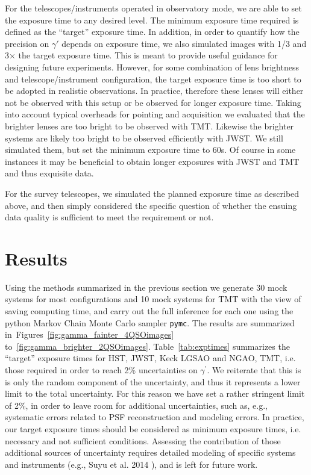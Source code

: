 \documentclass[a4paper,11pt]{article}
\begin{document}
{For the telescopes/instruments operated in observatory mode, we are
able to set the exposure time to any desired level. The minimum
exposure time required is defined as the ``target'' exposure time. In
addition, in order to quantify how the precision on $\gamma'$ depends
on exposure time, we also simulated images with 1/3 and 3$\times$ the
target exposure time. This is meant to provide useful guidance for
designing future experiments. However, for some combination of lens
brightness and telescope/instrument configuration, the target exposure
time is too short to be adopted in realistic observations. In
practice, therefore these lenses will either not be observed with this
setup or be observed for longer exposure time. Taking into account
typical overheads for pointing and acquisition we evaluated that the
brighter lenses are too bright to be observed with TMT.  Likewise the
brighter systems are likely too bright to be observed efficiently with
JWST. We still simulated them, but set the minimum exposure time to
60s. Of course in some instances it may be beneficial to obtain longer
exposures with JWST and TMT and thus exquisite data.

For the survey telescopes, we simulated the planned exposure time as
described above, and then  simply considered the specific question of
whether the ensuing data quality is sufficient to meet the requirement
or not.

\section{Results}

Using the methods summarized in the previous section we generate 30
mock systems for most configurations and 10 mock systems for TMT with
the view of saving computing time, and carry out the full inference
for each one using the python Markov Chain Monte Carlo sampler
\texttt{pymc}.  The results are summarized
in~Figures~\ref{fig:gamma_fainter_4QSOimages}
to~\ref{fig:gamma_brighter_2QSOimages}. Table~\ref{tab:exptimes}
summarizes the ``target'' exposure times for HST, JWST, Keck LGSAO and
NGAO, TMT, i.e. those required in order to reach 2\% uncertainties on
$\gamma^{\prime}$.  We reiterate that this is is only the random
component of the uncertainty, and thus it represents a lower limit to
the total uncertainty. For this reason we have set a rather stringent
limit of 2\%, in order to leave room for additional uncertainties,
such as, e.g., systematic errors related to PSF reconstruction and
modeling errors.  In practice, our target exposure times should be
considered as minimum exposure times, i.e. necessary and not
sufficient conditions. Assessing the contribution of those additional
sources of uncertainty requires detailed modeling of specific systems
and instruments (e.g., Suyu et al. 2014 \cite{2014ApJ...788L..35S}),
and is left for future work.

}
\end{document}
